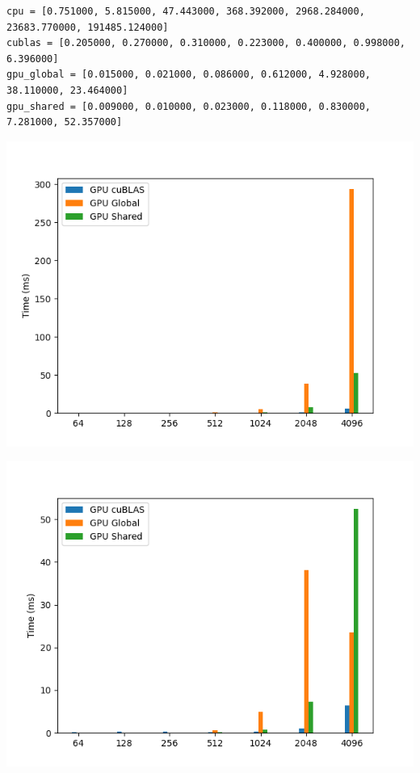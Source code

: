 \documentclass[english]{exam}
\begin{document}
\begin{enumerate}
\begin{itemize}
    \begin{lstlisting}
cpu = [0.751000, 5.815000, 47.443000, 368.392000, 2968.284000, 23683.770000, 191485.124000]
cublas = [0.205000, 0.270000, 0.310000, 0.223000, 0.400000, 0.998000, 6.396000]
gpu_global = [0.015000, 0.021000, 0.086000, 0.612000, 4.928000, 38.110000, 23.464000]
gpu_shared = [0.009000, 0.010000, 0.023000, 0.118000, 0.830000, 7.281000, 52.357000]
    \end{lstlisting}
  \end{itemize}
\begin{center}
    \includegraphics[scale=0.65]{gpu1.png}
  \end{center}

  \begin{center}
    \includegraphics[scale=0.65]{gpu2.png}
  \end{center}


\end{enumerate}
\end{document}
